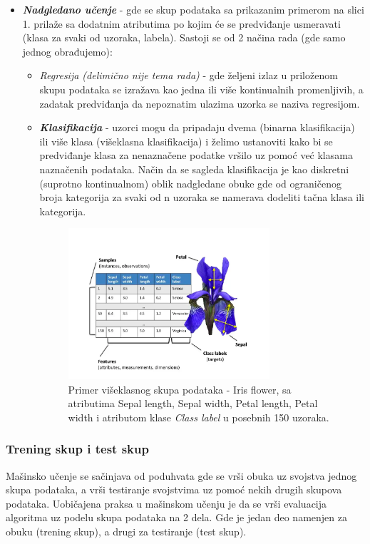 \documentclass[fontsize=12bp, paper=a4]{scrarticle}
\begin{document}
\begin{itemize}
    \item \textit{\textbf{Nadgledano učenje}} - gde se skup podataka sa prikazanim primerom na slici 1. prilaže sa dodatnim atributima po kojim će se predviđanje usmeravati (klasa za svaki od uzoraka, labela). Sastoji se od 2 načina rada (gde samo jednog obrađujemo):
    \begin{itemize}
        \item \textit{Regresija (delimično nije tema rada)} - gde željeni izlaz u priloženom skupu podataka se izražava kao jedna ili više kontinualnih promenljivih, a zadatak predviđanja da nepoznatim ulazima uzorka se naziva regresijom.
        \item \textit{\textbf{Klasifikacija}} - uzorci mogu da pripadaju dvema (binarna klasifikacija) ili više klasa (višeklasna klasifikacija) i želimo ustanoviti kako bi se predviđanje klasa za nenaznačene podatke vršilo uz pomoć već klasama naznačenih podataka. Način da se sagleda klasifikacija je kao diskretni (suprotno kontinualnom) oblik nadgledane obuke gde od ograničenog broja kategorija za svaki od n uzoraka se namerava dodeliti tačna klasa ili kategorija.
        \begin{figure}[h!]
            \centering
            \includegraphics[width=0.75\textwidth]{image.png}
            \caption{\centering Primer višeklasnog skupa podataka - Iris flower, sa atributima Sepal length, Sepal width, Petal length, Petal width i atributom klase \textit {Class label} u posebnih 150 uzoraka.}
        \end{figure}

    \end{itemize}    
\end{itemize}     

\subsubsection{Trening skup i test skup}
Mašinsko učenje se sačinjava od poduhvata gde se vrši obuka uz svojstva jednog skupa podataka, a vrši testiranje svojstvima uz pomoć nekih drugih skupova podataka. Uobičajena praksa u mašinskom učenju je da se vrši evaluacija algoritma uz podelu skupa podataka na 2 dela. Gde je jedan deo namenjen za obuku (trening skup), a drugi za testiranje (test skup).
\end{document}
